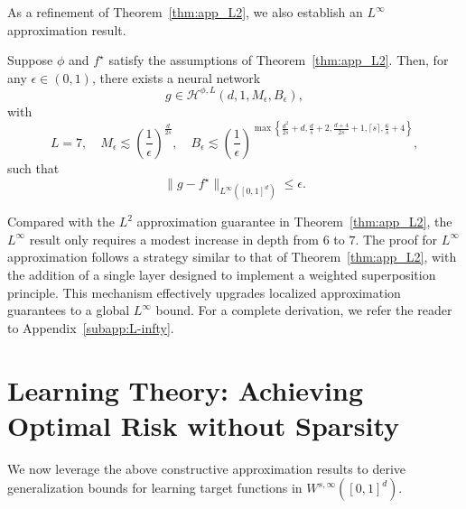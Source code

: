 \documentclass[11pt]{article}
\begin{document}
As a refinement of Theorem~\ref{thm:app_L2}, we also establish an $L^{\infty}$ approximation result.
\begin{theorem}
    Suppose $\phi$ and $f^\star$ satisfy the assumptions of Theorem~\ref{thm:app_L2}. Then, for any $\epsilon\in(0,1)$, there exists a neural network
    \begin{equation*}
        g \in \mathcal{H}^{\phi,L} (d, 1, M_{\epsilon}, B_{\epsilon}),
    \end{equation*}
    with 
    \begin{equation}
        L=7, \quad M_{\epsilon} \lesssim \left( \frac{1}{\epsilon}\right)^{\frac{d}{2s}}, \quad B_{\epsilon} \lesssim \left( \frac{1}{\epsilon}\right)^{\max \left\{ \frac{d^2}{2s}+d, \frac{d}{s}+2, \frac{d+4}{2s}+1, \lceil s \rceil, \frac{6}{s}+4\right\}} ,
        \label{eq:app-Linfty-width-norm}
    \end{equation}
    such that 
    \begin{equation*}
        \|g - f^\star\|_{L^{\infty}([0,1]^d)} \leq \epsilon. 
    \end{equation*}
    \label{thm:app_Linfty}
\end{theorem}
Compared with the $L^2$ approximation guarantee in Theorem~\ref{thm:app_L2}, the $L^\infty$ result only requires a modest increase in depth from $6$ to $7$. The proof for $L^\infty$ approximation follows a strategy similar to that of Theorem~\ref{thm:app_L2}, with the addition of a single layer designed to implement a weighted superposition principle. This mechanism effectively upgrades localized approximation guarantees to a global $L^\infty$ bound. For a complete derivation, we refer the reader to Appendix~\ref{subapp:L-infty}.


\section{Learning Theory: Achieving Optimal Risk without Sparsity}
\label{subsec: generalization}

We now leverage the above constructive approximation results  to derive  generalization bounds  for learning target functions in $W^{s,\infty}([0,1]^d)$.
\end{document}
